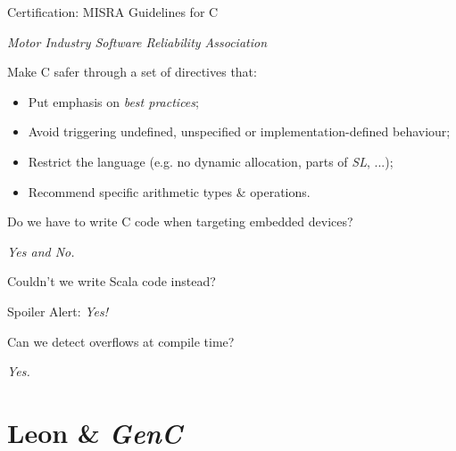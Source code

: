 \documentclass[xcolor={usenames,dvipsnames}]{beamer}
\newcommand{\GenC}{\emph{GenC}\xspace}
\newcommand{\QA}[2]{%
  \begin{flushleft}#1\end{flushleft}
  \pause
  \begin{flushright}#2\end{flushright}
}
\begin{document}
\begin{frame}[fragile]{Certification: \alert{MISRA} Guidelines for C}


  {\hfill \emph{Motor Industry Software Reliability Association}}
  \vfill

  Make C safer through a set of directives that:
  \begin{itemize}

    \item Put emphasis on \emph{best practices};
    \item Avoid triggering undefined, unspecified or implementation-defined behaviour;
    \item Restrict the language {\footnotesize(e.g. \alert{no dynamic allocation}, parts of \emph{SL}, ...);}
    \item Recommend specific arithmetic types \& operations.

  \end{itemize}

\end{frame}


\begin{frame}[standout]


  \QA{Do we have to write C code when targeting embedded devices?}{\emph{Yes and No.}}
  \pause \vfill

  \QA{Couldn't we write Scala code instead?}{Spoiler Alert: \emph{Yes!}}
  \pause \vfill

  \QA{Can we detect overflows at compile time?}{\emph{Yes.}}%

\end{frame}



\section{Leon \& \GenC}
\end{document}
